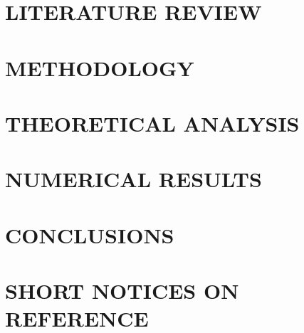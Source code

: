 \documentclass[a4paper,13pt,3p,twoside]{report}
\begin{document}
\pagestyle{fancy}
\fancyhf{}
\fancyhead[RE, LO]{\leftmark}
\fancyfoot[RE, LO]{\thepage}


\newpage
\chapter{LITERATURE REVIEW}


\newpage
\chapter{METHODOLOGY}


\newpage
\chapter{THEORETICAL ANALYSIS}


\newpage
\chapter{NUMERICAL RESULTS}


\newpage
\chapter{CONCLUSIONS}


\newpage
\chapter*{SHORT NOTICES ON REFERENCE}
\label{chapter:reference}

\end{document}
